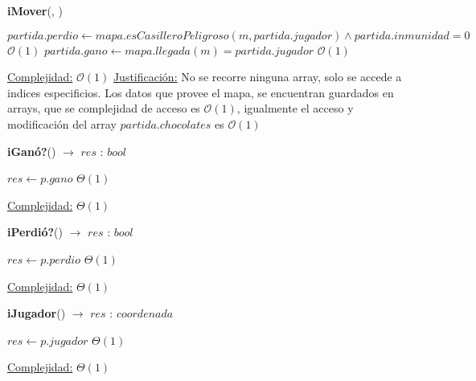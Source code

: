 \documentclass{book}
\newcommand{\bigO}{\mathcal{O}}
\begin{document}
\begin{Algoritmos}
\begin{algorithm}[H]{\textbf{iMover}(, )}
\begin{algorithmic}[1]
                    \State $partida.perdio \gets mapa.esCasilleroPeligroso(m, partida.jugador) \wedge partida.inmunidad = 0$    \Comment $\bigO(1)$
                    \State $partida.gano \gets mapa.llegada(m) = partida.jugador$                                               \Comment $\bigO(1)$

                \EndIf

                \medskip
                \Statex \underline{Complejidad:} $\bigO(1)$
                \Statex \underline{Justificación:} No se recorre ninguna array, solo se accede a indices especificios. Los datos que provee el mapa, se encuentran guardados en arrays, que se complejidad de acceso es $\bigO(1)$, igualmente el acceso y modificación del array $partida.chocolates$ es $\bigO(1)$
            \end{algorithmic}
    \end{algorithm}
        

    \begin{algorithm}[H]{\textbf{iGanó?}() $\to$ $res$ : $bool$}
        \begin{algorithmic}[1]
                \State $res \gets p.gano$                                                                   \Comment $\Theta(1)$

                \medskip
                \Statex \underline{Complejidad:} $\Theta(1)$
            \end{algorithmic}
    \end{algorithm}

    \begin{algorithm}[H]{\textbf{iPerdió?}() $\to$ $res$ : $bool$}
        \begin{algorithmic}[1]
                \State $res \gets p.perdio$                                                                 \Comment $\Theta(1)$

                \medskip
                \Statex \underline{Complejidad:} $\Theta(1)$
            \end{algorithmic}
    \end{algorithm}

    \begin{algorithm}[H]{\textbf{iJugador}() $\to$ $res$ : $coordenada$}
        \begin{algorithmic}[1]
                \State $res \gets p.jugador$                                                               \Comment $\Theta(1)$

                \medskip
                \Statex \underline{Complejidad:} $\Theta(1)$
            \end{algorithmic}
    \end{algorithm}


\end{Algoritmos}
\end{document}
